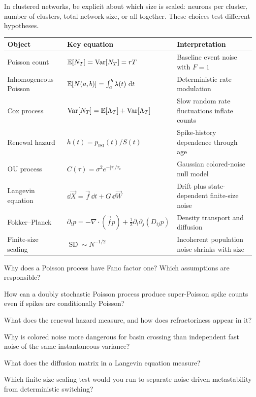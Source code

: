 In clustered networks, be explicit about which size is scaled: neurons per cluster, number of clusters, total network size, or all together. These choices test different hypotheses.

\begin{chaptersummary}

\begin{center}
\renewcommand{\arraystretch}{1.5}
\begin{tabularx}{\textwidth}{@{}l X X@{}}
  \toprule
  \textbf{Object} & \textbf{Key equation} & \textbf{Interpretation} \\
  \midrule
  Poisson count &
  $\mathbb{E}[N_T]=\operatorname{Var}[N_T]=rT$ &
  Baseline event noise with $F=1$ \\
  Inhomogeneous Poisson &
  $\mathbb{E}[N(a,b)]=\int_a^b\lambda(t)\,\mathop{}\!\mathrm{d} t$ &
  Deterministic rate modulation \\
  Cox process &
  $\operatorname{Var}[N_T]=\mathbb{E}[\Lambda_T]+\operatorname{Var}[\Lambda_T]$ &
  Slow random rate fluctuations inflate counts \\
  Renewal hazard &
  $h(t)=p_{\mathrm{ISI}}(t)/S(t)$ &
  Spike-history dependence through age \\
  OU process &
  $C(\tau)=\sigma^2e^{-|\tau|/\tau_c}$ &
  Gaussian colored-noise null model \\
  Langevin equation &
  $\dd\vec{X}=\vec{f}\,\dd t+G\,\dd\vec{W}$ &
  Drift plus state-dependent finite-size noise \\
  Fokker--Planck &
  $\partial_t p=-\nabla\cdot(\vec{f}p)+\frac12\partial_i\partial_j(D_{ij}p)$ &
  Density transport and diffusion \\
  Finite-size scaling &
  $\operatorname{SD}\sim N^{-1/2}$ &
  Incoherent population noise shrinks with size \\
  \bottomrule
\end{tabularx}
\end{center}

\end{chaptersummary}

\begin{conceptquestions}
  \item Why does a Poisson process have Fano factor one? Which assumptions are responsible?
  \item How can a doubly stochastic Poisson process produce super-Poisson spike counts even if spikes are conditionally Poisson?
  \item What does the renewal hazard measure, and how does refractoriness appear in it?
  \item Why is colored noise more dangerous for basin crossing than independent fast noise of the same instantaneous variance?
  \item What does the diffusion matrix in a Langevin equation measure?
  \item Which finite-size scaling test would you run to separate noise-driven metastability from deterministic switching?
\end{conceptquestions}

\clearpage
